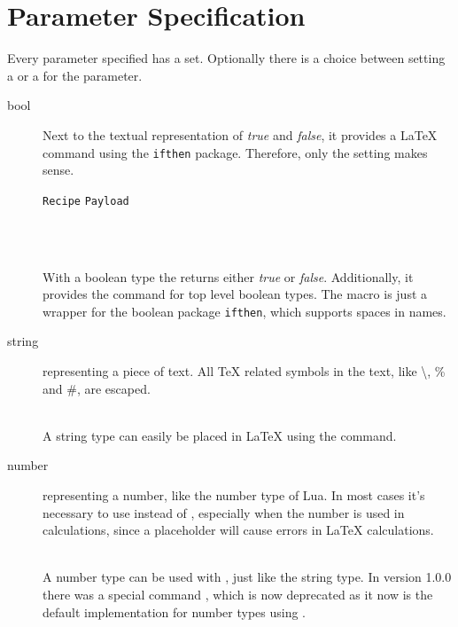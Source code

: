 \documentclass{ltxdoc}
\newcommand\showexample[5][15pt]{%
\begin{minipage}[t]{.5\linewidth - .5 \columnsep}%

\end{minipage}\hspace*{\columnsep}%
\begin{minipage}[t]{.5\linewidth - .5 \columnsep}%

\end{minipage}\\%
}
\begin{document}
    \section{Parameter Specification}\label{sec:spec}
    Every parameter specified has a  set.
    Optionally there is a choice between setting a  or a  for the parameter.
    \begin{description}
        \item[bool] Next to the textual representation of \textit{true} and \textit{false}, it provides a \LaTeX{} command using the \texttt{ifthen} package.
        Therefore, only the  setting makes sense.\\[5pt]
        \hspace*{5pt}\parbox{\linewidth-5pt}{%
            \hfill\texttt{Recipe}\hfill\hspace*{\columnsep}%
            \hfill\texttt{Payload}\hfill\hspace*{\columnsep}}\\%
        \showexample{1}{1-3}{1}{1-1}
        \DescribeMacro{\param}
        With a boolean type the \cmd{\param} returns either \textit{true} or \textit{false}.
        \DescribeMacro{\ifparam}
        Additionally, it provides the \cmd{\ifparam} command for top level boolean types.
        The macro is just a wrapper for the boolean package \texttt{ifthen}, which supports spaces in names.
        \item[string] representing a piece of text.
        All \TeX{} related symbols in the text, like \textbackslash, \% and \#, are escaped.\\
        \showexample{4}{4-6}{2}{2-2}
        \DescribeMacro{\param} A string type can easily be placed in \LaTeX{} using the \cmd{\param} command.
        \item[number] representing a number, like the number type of Lua.
        In most cases it's necessary to use  instead of , especially when the number is used in calculations, since a placeholder will cause errors in \LaTeX{} calculations.\\
        \showexample{7}{7-9}{3}{3-3}
        \DescribeMacro{\param}
        A number type can be used with \cmd{\param}, just like the string type.
        In version 1.0.0 there was a special command \cmd{\numparam}, which is now deprecated as it now is the default implementation for number types using \cmd{\param}.

\end{description}
\end{document}
